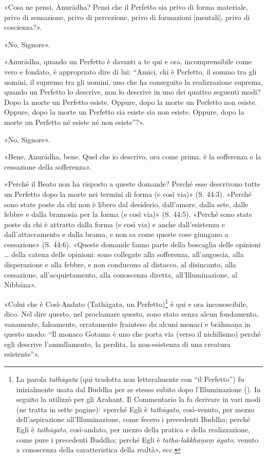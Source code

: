 «Cosa ne pensi, Anurādha? Pensi che il Perfetto sia privo di forma materiale,
privo di sensazione, privo di percezione, privo di formazioni [mentali], privo
di coscienza?».

«No, Signore».

«Anurādha, quando un Perfetto è davanti a te qui e ora, incomprensibile come
vero e fondato, è appropriato dire di lui: “Amici, chi è Perfetto, il sommo tra
gli uomini, il supremo tra gli uomini, uno che ha conseguito la realizzazione
suprema, quando un Perfetto lo descrive, non lo descrive in uno dei quattro
seguenti modi? Dopo la morte un Perfetto esiste. Oppure, dopo la morte un
Perfetto non esiste. Oppure, dopo la morte un Perfetto sia esiste sia non
esiste. Oppure, dopo la morte un Perfetto né esiste né non esiste”?».

«No, Signore».

«Bene, Anurādha, bene. Quel che io descrivo, ora come prima, è la sofferenza e
la cessazione della sofferenza».


«Perché il Beato non ha risposto a queste domande? Perché esse descrivono tutte
un Perfetto dopo la morte nei termini di forma (e così via)» (S. 44:3). «Perché
sono state poste da chi non è libero dal desiderio, dall’amore, dalla sete,
dalle febbre e dalla bramosia per la forma (e così via)» (S. 44:5). «Perché sono
state poste da chi è attratto dalla forma (e così via) e anche dall’esistenza e
dall’attaccamento e dalla brama, e non sa come queste cose giungano a
cessazione» (S. 44:6). «Queste domande fanno parte della boscaglia delle
opinioni … della catena delle opinioni: sono collegate alla sofferenza,
all’angoscia, alla disperazione e alla febbre, e non conducono al distacco, al
disincanto, alla cessazione, all’acquietamento, alla conoscenza diretta,
all’Illuminazione, al Nibbāna».


\label{pag226}%
«Colui che è Così-Andato (Tathāgata, un Perfetto)\footnote{La parola
  \emph{tathāgata} (qui tradotta non letteralmente con “il Perfetto”) fu
  inizialmente usata dal Buddha per se stesso subito dopo l’Illuminazione
  (\hyperlink{cap-03-Dopo-l-Illuminazione#pag41}{}). In seguito la utilizzò per
  gli Arahant. Il Commentario la fa derivare in vari modi (ne tratta in sette
  pagine): «perché Egli è \emph{tathāgato}, così-venuto, per mezzo
  dell’aspirazione all’Illuminazione, come fecero i precedenti Buddha; perché
  Egli è \emph{tathāgato}, così-andato, per mezzo della pratica e della
  realizzazione, come pure i precedenti Buddha; perché Egli è
  \emph{tatha-lakkhaṇaṃ āgato}, venuto a conoscenza della caratteristica della
  realtà», ecc.} è qui e ora inconoscibile, dico. Nel dire questo, nel
proclamare questo, sono stato senza alcun fondamento, vanamente, falsamente,
erratamente frainteso da alcuni monaci e brāhmaṇa in questo modo: “Il monaco
Gotama è uno che porta via (verso il nichilismo) perché egli descrive
l’annullamento, la perdita, la non-esistenza di una creatura esistente”».


